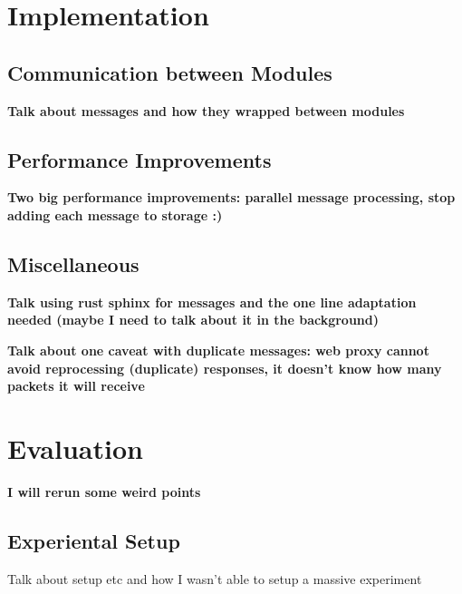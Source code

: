 \documentclass[a4paper,11pt,oneside]{report}
\begin{document}
\chapter{Implementation}


\section{Communication between Modules}
\textbf{Talk about messages and how they wrapped between modules}

\section{Performance Improvements}
\textbf{Two big performance improvements: parallel message processing, stop adding each message to storage :)}

\section{Miscellaneous}
\textbf{Talk using rust sphinx for messages and the one line adaptation needed (maybe I need to talk about it in the background)}

\textbf{Talk about one caveat with duplicate messages: web proxy cannot avoid reprocessing (duplicate) responses, it doesn't know how many packets it will receive}

\chapter{Evaluation}



\textbf{I will rerun some weird points}
\section{Experiental Setup}
Talk about setup etc and how I wasn't able to setup a massive experiment
\end{document}
